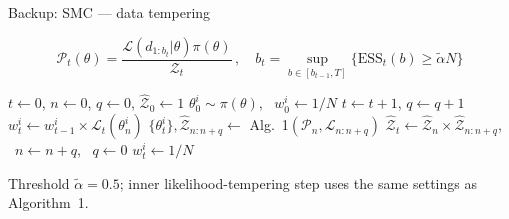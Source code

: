 \documentclass[usenames,dvipsnames,t]{beamer}
\begin{document}
\begin{frame}{Backup: SMC --- data tempering}
  \def\x{1mm}

  \small
  \begin{equation*}
    \mathcal{P}_t(\theta) = \frac{\mathcal{L}(d_{1:b_t}|\theta)\pi(\theta)}{\mathcal{Z}_t} \, , \quad b_t = \sup_{b \in [b_{t-1},T]}\{\mathrm{ESS}_t(b) \geq \tilde\alpha N\}
  \end{equation*}
  \normalsize


  \vspace{3mm}

  \scriptsize
  \begin{algorithmic}[1]
    \State $t \gets 0$, $n \gets 0$, $q \gets 0$, $\hat{\mathcal{Z}}_0 \gets 1$
      \State $\theta_0^i \sim \pi(\theta)$, \ $w_0^i \gets 1/N$
    \EndFor
      \State $t \gets t+1$, $q \gets q+1$
        \State $w_t^i \gets w_{t-1}^i \times \mathcal{L}_t(\theta_n^i)$ 
      \EndFor
        \State $\{\theta_t^i\}, \hat{\mathcal{Z}}_{n:n+q} \gets$ Alg.~1$(\mathcal{P}_n, \mathcal{L}_{n:n+q})$ 
        \State $\hat{\mathcal{Z}}_t \gets \hat{\mathcal{Z}}_n \times \hat{\mathcal{Z}}_{n:n+q}$, \ $n \gets n+q$, \ $q \gets 0$
        \State $w_t^i \gets 1/N$ 
      \EndIf
    \EndWhile
  \end{algorithmic}
  \normalsize

  \vspace{-1mm}
  \scriptsize Threshold $\tilde\alpha = 0.5$; inner likelihood-tempering step uses the same settings as Algorithm~1. \normalsize

\end{frame}
\end{document}

